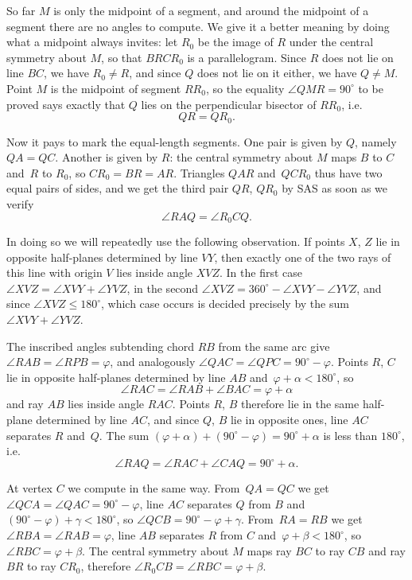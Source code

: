{    So far $M$ is only the midpoint of a segment, and around the midpoint of a segment there are no angles to compute. We give it a better meaning by doing what a midpoint always invites: let $R_0$ be the image of $R$ under the central symmetry about $M$, so that $BRCR_0$ is a parallelogram. Since $R$ does not lie on line $BC$, we have $R_0 \neq R$, and since $Q$ does not lie on it either, we have $Q \neq M$. Point $M$ is the midpoint of segment $RR_0$, so the equality $\angle QMR = 90^\circ$ to be proved says exactly that $Q$ lies on the perpendicular bisector of $RR_0$, i.e.
    $$
    QR = QR_0.
    $$

    Now it pays to mark the equal-length segments. One pair is given by $Q$, namely $QA = QC$. Another is given by $R$: the central symmetry about $M$ maps $B$ to $C$ and~$R$ to $R_0$, so $CR_0 = BR = AR$. Triangles $QAR$ and~$QCR_0$ thus have two equal pairs of sides, and we get the third pair $QR$, $QR_0$ by SAS as soon as we verify
    $$
    \angle RAQ = \angle R_0CQ.
    $$

    In doing so we will repeatedly use the following observation. If points $X$, $Z$ lie in opposite half-planes determined by line $VY$, then exactly one of the two rays of this line with origin $V$ lies inside angle $XVZ$. In the first case $\angle XVZ = \angle XVY + \angle YVZ$, in the second $\angle XVZ = 360^\circ - \angle XVY - \angle YVZ$, and since $\angle XVZ \leq 180^\circ$, which case occurs is decided precisely by the sum $\angle XVY + \angle YVZ$.

    The inscribed angles subtending chord $RB$ from the same arc give $\angle RAB = \angle RPB = \varphi$, and analogously $\angle QAC = \angle QPC = 90^\circ - \varphi$. Points $R$, $C$ lie in opposite half-planes determined by line $AB$ and~$\varphi + \alpha < 180^\circ$, so
    $$
    \angle RAC = \angle RAB + \angle BAC = \varphi + \alpha
    $$
    and ray $AB$ lies inside angle $RAC$. Points $R$, $B$ therefore lie in the same half-plane determined by line $AC$, and since $Q$, $B$ lie in opposite ones, line $AC$ separates $R$ and~$Q$. The sum $(\varphi + \alpha) + (90^\circ - \varphi) = 90^\circ + \alpha$ is less than $180^\circ$, i.e.
    $$
    \angle RAQ = \angle RAC + \angle CAQ = 90^\circ + \alpha.
    $$

    At vertex $C$ we compute in the same way. From~$QA = QC$ we get $\angle QCA = \angle QAC = 90^\circ - \varphi$, line $AC$ separates $Q$ from $B$ and~$(90^\circ - \varphi) + \gamma < 180^\circ$, so $\angle QCB = 90^\circ - \varphi + \gamma$. From~$RA = RB$ we get $\angle RBA = \angle RAB = \varphi$, line $AB$ separates $R$ from $C$ and~$\varphi + \beta < 180^\circ$, so $\angle RBC = \varphi + \beta$. The central symmetry about $M$ maps ray $BC$ to ray $CB$ and ray $BR$ to ray $CR_0$, therefore $\angle R_0CB = \angle RBC = \varphi + \beta$.

}
